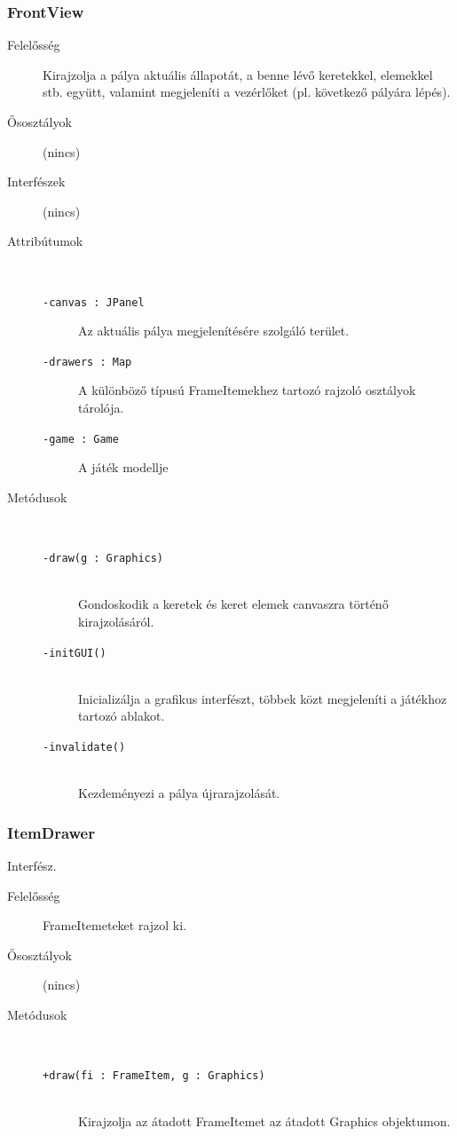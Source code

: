 		\subsubsection{FrontView}
			\begin{description}

				\item[Felelősség] Kirajzolja a pálya aktuális állapotát, a benne lévő keretekkel, elemekkel stb. együtt, valamint megjeleníti a vezérlőket (pl. következő pályára lépés).

				\item[Ősosztályok] (nincs)
				\item[Interfészek] (nincs)
				\item[Attribútumok]$\ $
					\begin{description}
						\item[\texttt{-canvas : JPanel}]Az aktuális pálya megjelenítésére szolgáló terület.
						\item[\texttt{-drawers : Map}]A különböző típusú FrameItemekhez tartozó rajzoló osztályok tárolója.
						\item[\texttt{-game : Game}]A játék modellje
					\end{description}
				\item[Metódusok]$\ $
					\begin{description}
						\item[\texttt{-draw(g : Graphics)}] \hfill \\Gondoskodik a keretek és keret elemek canvaszra történő kirajzolásáról. 
						\item[\texttt{-initGUI()}] \hfill \\Inicializálja a grafikus interfészt,  többek közt megjeleníti a játékhoz tartozó ablakot. 
						\item[\texttt{-invalidate()}] \hfill \\Kezdeményezi a pálya újrarajzolását. 
					\end{description}
			\end{description}

		\subsubsection{ItemDrawer} Interfész.
			\begin{description}

				\item[Felelősség] FrameItemeteket rajzol ki.

				\item[Ősosztályok] (nincs)
				\item[Metódusok]$\ $
					\begin{description}
						\item[\texttt{+draw(fi : FrameItem, g : Graphics)}] \hfill \\Kirajzolja az átadott FrameItemet az átadott Graphics objektumon. 
					\end{description}
			\end{description}

